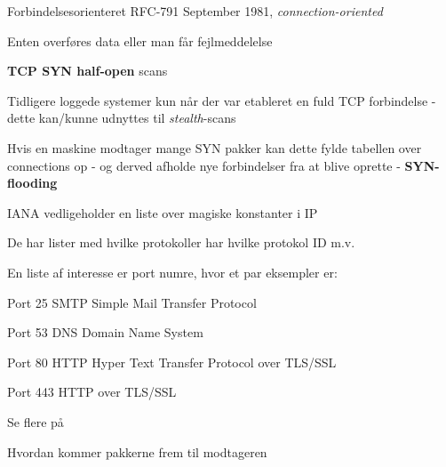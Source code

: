 \documentclass[Screen16to9,17pt,footrule]{foils}
\begin{document}

\begin{list1}
\item Forbindelsesorienteret RFC-791 September 1981, \emph{connection-oriented}
\item Enten overføres data eller man får fejlmeddelelse
\end{list1}






\begin{list2}
\item {\bfseries TCP SYN half-open} scans
\item Tidligere loggede systemer kun når der var etableret en fuld TCP
  forbindelse - dette kan/kunne udnyttes til \emph{stealth}-scans
\item Hvis en maskine modtager mange SYN pakker kan dette fylde
  tabellen over connections op - og derved afholde nye forbindelser
  fra at blive oprette - {\bfseries SYN-flooding}
\end{list2}



\begin{list1}
\item IANA vedligeholder en liste over magiske konstanter i IP
\item De har lister med hvilke protokoller har hvilke protokol ID m.v.
\item En liste af interesse er port numre, hvor et par eksempler er:
\begin{list2}
\item Port 25 SMTP Simple Mail Transfer Protocol
\item Port 53 DNS Domain Name System
\item Port 80 HTTP Hyper Text Transfer Protocol over TLS/SSL
\item Port 443 HTTP over TLS/SSL
\end{list2}
\item Se flere på 
\end{list1}


Hvordan kommer pakkerne frem til modtageren
\end{document}
